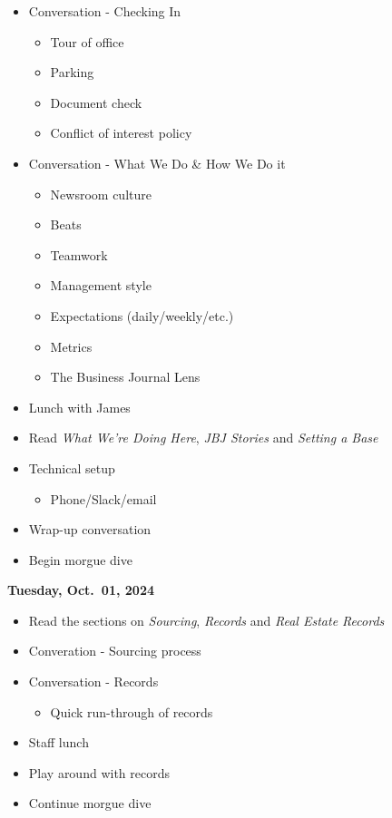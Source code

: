 \documentclass[
  11pt,
  american,
  letterpaperpaper,
  extrafontsizes,onecolumn,openright
  ]{memoir}
\providecommand{\tightlist}{%
  \setlength{\itemsep}{0pt}\setlength{\parskip}{0pt}}
\begin{document}
\begin{itemize}
\tightlist
\item
  Conversation - Checking In

  \begin{itemize}
  \tightlist
  \item
    Tour of office
  \item
    Parking
  \item
    Document check
  \item
    Conflict of interest policy
  \end{itemize}
\item
  Conversation - What We Do \& How We Do it

  \begin{itemize}
  \tightlist
  \item
    Newsroom culture
  \item
    Beats
  \item
    Teamwork
  \item
    Management style
  \item
    Expectations (daily/weekly/etc.)
  \item
    Metrics
  \item
    The Business Journal Lens
  \end{itemize}
\item
  Lunch with James
\item
  Read \emph{What We're Doing Here}, \emph{JBJ Stories} and \emph{Setting a Base}
\item
  Technical setup

  \begin{itemize}
  \tightlist
  \item
    Phone/Slack/email
  \end{itemize}
\item
  Wrap-up conversation
\item
  Begin morgue dive
\end{itemize}

\textbf{Tuesday, Oct.~01, 2024}

\begin{itemize}
\tightlist
\item
  Read the sections on \emph{Sourcing}, \emph{Records} and \emph{Real Estate Records}
\item
  Converation - Sourcing process
\item
  Conversation - Records

  \begin{itemize}
  \tightlist
  \item
    Quick run-through of records
  \end{itemize}
\item
  Staff lunch
\item
  Play around with records
\item
  Continue morgue dive
\end{itemize}
\end{document}
